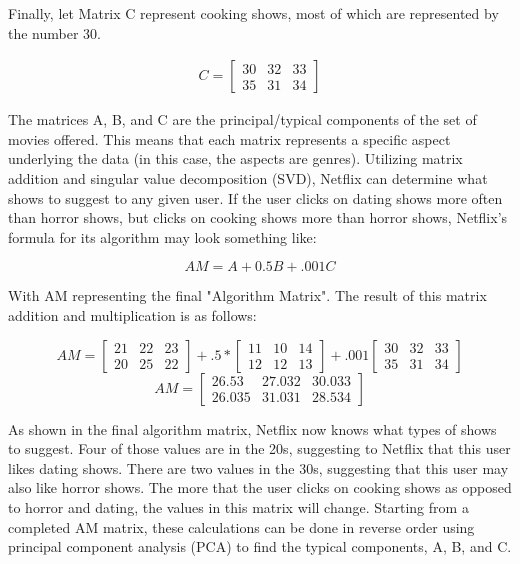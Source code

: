 \documentclass[11pt,a4paper]{article}
\begin{document}
Finally, let Matrix C represent cooking shows, most of which are represented by the number 30.

\begin{align*}
    C = \begin{bmatrix}
            30 & 32 & 33 \\
            35 & 31 & 34
        \end{bmatrix}
\end{align*}

The matrices A, B, and C are the principal/typical components of the set of movies offered. This means that each matrix represents a specific aspect underlying the data (in this case, the aspects are genres). Utilizing matrix addition and singular value decomposition (SVD), Netflix can determine what shows to suggest to any given user. If the user clicks on dating shows more often than horror shows, but clicks on cooking shows more than horror shows, Netflix's formula for its algorithm may look something like:

\begin{equation}
    AM = A + 0.5B + .001C
\end{equation}
\hfill

\noindent With AM representing the final "Algorithm Matrix". The result of this matrix addition and multiplication is as follows:

\begin{equation}
    AM = \begin{bmatrix}
        21 & 22 & 23 \\
        20 & 25 & 22
    \end{bmatrix} + .5*\begin{bmatrix}
        11 & 10 & 14 \\
        12 & 12 & 13
    \end{bmatrix} + .001\begin{bmatrix}
        30 & 32 & 33 \\
        35 & 31 & 34
    \end{bmatrix}
\end{equation}
\hfill
\begin{equation}
    AM = \begin{bmatrix}
        26.53  & 27.032 & 30.033 \\
        26.035 & 31.031 & 28.534
    \end{bmatrix}
\end{equation}

As shown in the final algorithm matrix, Netflix now knows what types of shows to suggest. Four of those values are in the 20s, suggesting to Netflix that this user likes dating shows. There are two values in the 30s, suggesting that this user may also like horror shows. The more that the user clicks on cooking shows as opposed to horror and dating, the values in this matrix will change. Starting from a completed AM matrix, these calculations can be done in reverse order using principal component analysis (PCA) to find the typical components, A, B, and C.
\end{document}

